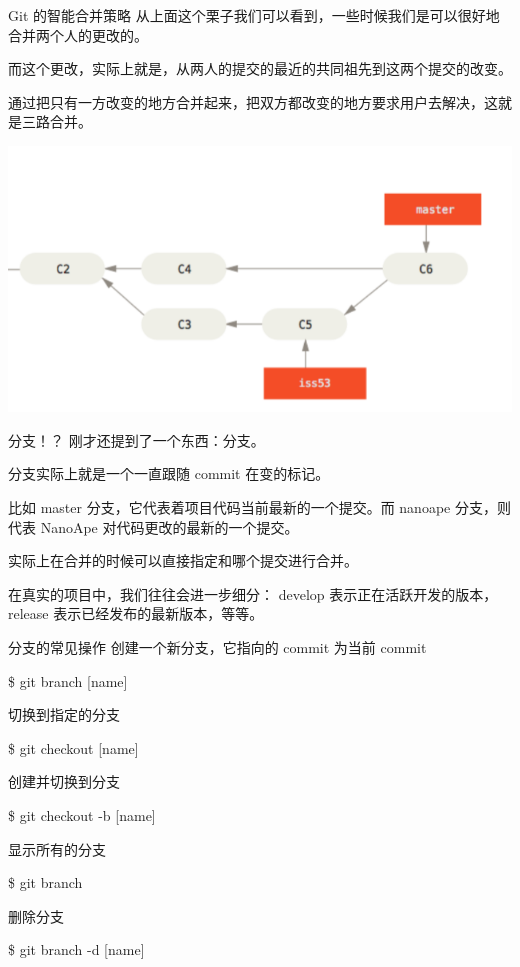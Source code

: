 \documentclass{beamer}
\begin{document}
\begin{frame}{Git 的智能合并策略}
    从上面这个栗子我们可以看到，一些时候我们是可以很好地合并两个人的更改的。

    而这个更改，实际上就是，从两人的提交的最近的共同祖先到这两个提交的改变。

    通过把只有一方改变的地方合并起来，把双方都改变的地方要求用户去解决，这就是三路合并。

    \includegraphics[width=\linewidth]{2018-10-26-16-15-08.png}
\end{frame}

\begin{frame}{分支！？}
    刚才还提到了一个东西：分支。

    分支实际上就是一个一直跟随 commit 在变的标记。

    比如 master 分支，它代表着项目代码当前最新的一个提交。而 nanoape 分支，则代表 NanoApe 对代码更改的最新的一个提交。

    实际上在合并的时候可以直接指定和哪个提交进行合并。

    在真实的项目中，我们往往会进一步细分： develop 表示正在活跃开发的版本， release 表示已经发布的最新版本，等等。
\end{frame}

\begin{frame}{分支的常见操作}
    创建一个新分支，它指向的 commit 为当前 commit

    \$ git branch [name]

    切换到指定的分支

    \$ git checkout [name]

    创建并切换到分支

    \$ git checkout -b [name]

    显示所有的分支

    \$ git branch

    删除分支

    \$ git branch -d [name]
\end{frame}
\end{document}
